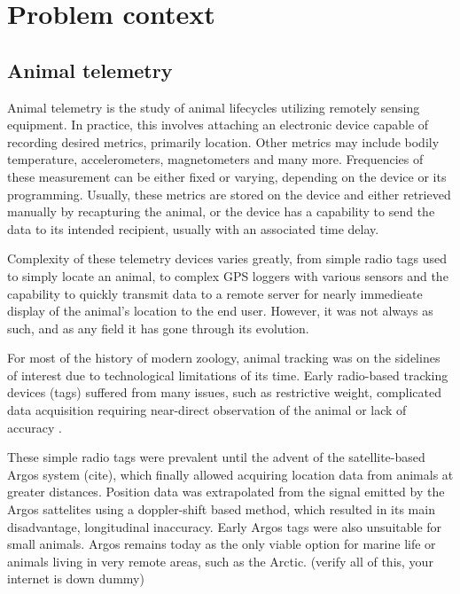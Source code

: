 
\chapter{Problem context}

\section{Animal telemetry}

Animal telemetry is the study of animal lifecycles utilizing remotely sensing equipment. In practice, this involves attaching an electronic device capable of recording desired metrics, primarily location. Other metrics may include bodily temperature, accelerometers, magnetometers and many more. Frequencies of these measurement can be either fixed or varying, depending on the device or its programming. Usually, these metrics are stored on the device and either retrieved manually by recapturing the animal, or the device has a capability to send the data to its intended recipient, usually with an associated time delay.

Complexity of these telemetry devices varies greatly, from simple radio tags used to simply locate an animal, to complex GPS loggers with various sensors and the capability to quickly transmit data to a remote server for nearly immedieate display of the animal's location to the end user. However, it was not always as such, and as any field it has gone through its evolution.

For most of the history of modern zoology, animal tracking was on the sidelines of interest due to technological limitations of its time. Early radio-based tracking devices (tags) suffered from many issues, such as restrictive weight, complicated data acquisition requiring near-direct observation of the animal or lack of accuracy \cite{kays2015terrestrial}.

These simple radio tags were prevalent until the advent of the satellite-based Argos system (cite), which finally allowed acquiring location data from animals at greater distances. Position data was extrapolated from the signal emitted by the Argos sattelites using a doppler-shift based method, which resulted in its main disadvantage, longitudinal inaccuracy. Early Argos tags were also unsuitable for small animals. Argos remains today as the only viable option for marine life or animals living in very remote areas, such as the Arctic. (verify all of this, your internet is down dummy)

